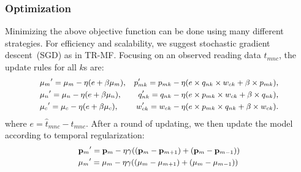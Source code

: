 
\subsubsection{Optimization}
Minimizing the above objective function can be done using many different strategies.
For efficiency and scalability, we suggest stochastic gradient descent~(SGD) as in TR-MF.
Focusing on an observed reading data $t_{mnc} $, the update rules for all $k$s are:
\begin{equation*}
\small
\begin{aligned}
&{\mu_m}^\prime=\mu_m-\eta(e+\beta\mu_m),   &p_{mk}^\prime=p_{mk}-\eta(e\times q_{nk}\times w_{ck} + \beta \times p_{mk}), \\
&{\mu_n}^\prime=\mu_n-\eta(e+\beta\mu_n),   &q_{nk}^\prime=q_{nk}-\eta(e\times p_{mk}\times w_{ck} + \beta \times q_{nk}), \\
&{\mu_c}^\prime=\mu_c-\eta(e+\beta\mu_c),   &w_{ck}^\prime=w_{ck}-\eta(e\times p_{mk}\times q_{nk} + \beta \times w_{ck}). \\
\end{aligned}
\end{equation*}
where $e=\hat{t}_{mnc}-t_{mnc}$. After a round of updating, we then update the model according to temporal regularization:
\begin{equation*}
\small
\begin{aligned}
&{\mathbf{p}_m}^\prime={\mathbf{p}_m}-\eta\gamma((\mathbf{p}_m-\mathbf{p}_{m+1})+(\mathbf{p}_m-\mathbf{p}_{m-1}))
\\&{\mu_m}^\prime=\mu_m-\eta\gamma((\mu_m-\mu_{m+1})+(\mu_m-\mu_{m-1}))
\end{aligned}
\end{equation*}

